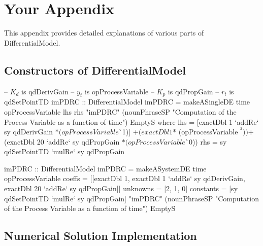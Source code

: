 \chapter{Your Appendix}
\label{appendix_a}

This appendix provides detailed explanations of various parts of DifferentialModel.

\section{Constructors of DifferentialModel}
\label{const_de}

\begin{haskell1}
-- $K_d$ is qdDerivGain
-- $y_t$ is opProcessVariable
-- $K_p$ is qdPropGain
-- $r_t$ is qdSetPointTD
imPDRC :: DifferentialModel
imPDRC = makeASingleDE
	time
	opProcessVariable
	lhs
	rhs
	"imPDRC"
	(nounPhraseSP "Computation of the Process Variable as a function of time")
	EmptyS
	where 
	lhs = [exactDbl 1 `addRe` sy qdDerivGain $* (opProcessVariable $^^ 1)]
	$+ (exactDbl 1 $* (opProcessVariable $^^ 2))
	$+ (exactDbl 20 `addRe` sy qdPropGain $* (opProcessVariable $^^ 0))
	rhs = sy qdSetPointTD `mulRe` sy qdPropGain
\end{haskell1}

\begin{haskell1}
imPDRC :: DifferentialModel
imPDRC = makeASystemDE
	time
	opProcessVariable
	coeffs = [[exactDbl 1, exactDbl 1 `addRe` sy qdDerivGain, exactDbl 20 `addRe` sy qdPropGain]]
	unknowns = [2, 1, 0]
	constants = [sy qdSetPointTD `mulRe` sy qdPropGain]
	"imPDRC"
	(nounPhraseSP "Computation of the Process Variable as a function of time")
	EmptyS
\end{haskell1}

\section{Numerical Solution Implementation}
\label{numsol}

    
